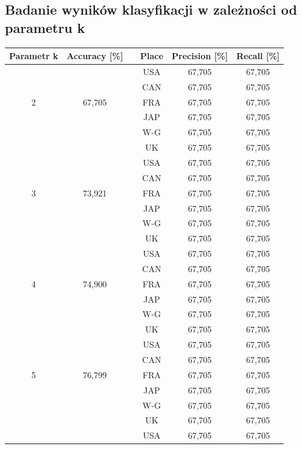 \documentclass{classrep}
\begin{document}
\subsection{Badanie wyników klasyfikacji w zależności od parametru k}
\begin{table}[h!]
	\centering
	\begin{tabular} {c c c c c c}
		\hline
		\textbf{Parametr k} & \textbf{Accuracy [\%]} & \vline & \textbf{Place} & \textbf{Precision [\%]} & \textbf{Recall [\%]}\\ [0.5ex] 
		\hline
		\hline 
		&   		&\vline& USA & 67,705 & 67,705 \\
		&			&\vline& CAN & 67,705 & 67,705 \\
		2 & 67,705	&\vline& FRA & 67,705 & 67,705 \\
		&			&\vline& JAP & 67,705 & 67,705 \\
		&			&\vline& W-G & 67,705 & 67,705 \\
		&			&\vline& UK  & 67,705 & 67,705 \\
		\hline 
		&   		&\vline& USA & 67,705 & 67,705 \\
		&			&\vline& CAN & 67,705 & 67,705 \\
		3 & 73,921	&\vline& FRA & 67,705 & 67,705 \\
		&			&\vline& JAP & 67,705 & 67,705 \\
		&			&\vline& W-G & 67,705 & 67,705 \\
		&			&\vline& UK  & 67,705 & 67,705 \\
		\hline 
		&   		&\vline& USA & 67,705 & 67,705 \\
		&			&\vline& CAN & 67,705 & 67,705 \\
		4 & 74,900 	&\vline& FRA & 67,705 & 67,705 \\
		&			&\vline& JAP & 67,705 & 67,705 \\
		&			&\vline& W-G & 67,705 & 67,705 \\
		&			&\vline& UK  & 67,705 & 67,705 \\
		\hline 
		&   		&\vline& USA & 67,705 & 67,705 \\
		&			&\vline& CAN & 67,705 & 67,705 \\
		5 & 76,799 	&\vline& FRA & 67,705 & 67,705 \\
		&			&\vline& JAP & 67,705 & 67,705 \\
		&			&\vline& W-G & 67,705 & 67,705 \\
		&			&\vline& UK  & 67,705 & 67,705 \\
		\hline 
		&   		&\vline& USA & 67,705 & 67,705 \\

\end{tabular}
\end{table}
\end{document}
